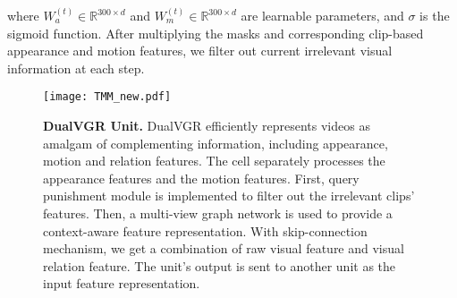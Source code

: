 \documentclass[journal]{IEEEtran}
\begin{document}
where $W^{\left(t\right)}_a \in \mathbb{R}^{300 \times d}$ and $W^{\left(t\right)}_m \in \mathbb{R}^{300 \times d}$ are learnable parameters, and $\sigma$ is the sigmoid function. After multiplying the masks and corresponding clip-based appearance and motion features, we filter out current irrelevant visual information at each step. 
\begin{figure}[t]
    \centering
    \texttt{[image: TMM\_new.pdf]}
    \caption{\textbf{DualVGR Unit.} DualVGR efficiently represents videos as amalgam of complementing information, including appearance, motion and relation features. The cell separately processes the appearance features and the motion features. First, query punishment module is implemented to filter out the irrelevant clips' features. Then, a multi-view graph network is used to provide a context-aware feature representation. With skip-connection mechanism, we get a combination of raw visual feature and visual relation feature. The unit's output is sent to another unit as the input feature representation.}
    \label{fig:DualVGR}
\end{figure}
\end{document}
